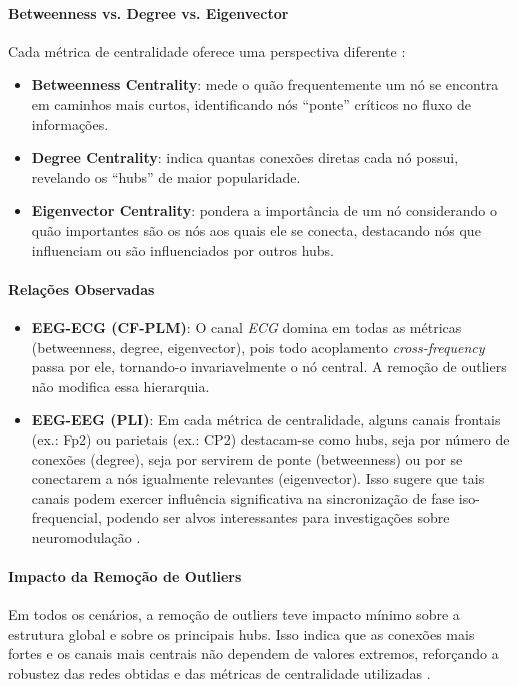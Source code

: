 \paragraph{Betweenness vs. Degree vs. Eigenvector} Cada métrica de centralidade oferece uma perspectiva diferente \cite{rubinov2010complex}:
\begin{itemize}
    \item \textbf{Betweenness Centrality}: mede o quão frequentemente um nó se encontra em caminhos mais curtos, identificando nós “ponte” críticos no fluxo de informações.  
    \item \textbf{Degree Centrality}: indica quantas conexões diretas cada nó possui, revelando os “hubs” de maior popularidade.  
    \item \textbf{Eigenvector Centrality}: pondera a importância de um nó considerando o quão importantes são os nós aos quais ele se conecta, destacando nós que influenciam ou são influenciados por outros hubs.  
\end{itemize}

\paragraph{Relações Observadas}
\begin{itemize}
    \item \textbf{EEG-ECG (CF-PLM)}: O canal \emph{ECG} domina em todas as métricas (betweenness, degree, eigenvector), pois todo acoplamento \emph{cross-frequency} passa por ele, tornando-o invariavelmente o nó central. A remoção de outliers não modifica essa hierarquia.
    \item \textbf{EEG-EEG (PLI)}: Em cada métrica de centralidade, alguns canais frontais (ex.: Fp2) ou parietais (ex.: CP2) destacam-se como hubs, seja por número de conexões (degree), seja por servirem de ponte (betweenness) ou por se conectarem a nós igualmente relevantes (eigenvector). Isso sugere que tais canais podem exercer influência significativa na sincronização de fase iso-frequencial, podendo ser alvos interessantes para investigações sobre neuromodulação \cite{bullmore2009complex, rubinov2010complex}.
\end{itemize}

\paragraph{Impacto da Remoção de Outliers}  
Em todos os cenários, a remoção de outliers teve impacto mínimo sobre a estrutura global e sobre os principais hubs. Isso indica que as conexões mais fortes e os canais mais centrais não dependem de valores extremos, reforçando a robustez das redes obtidas e das métricas de centralidade utilizadas \cite{newman2010networks}.

